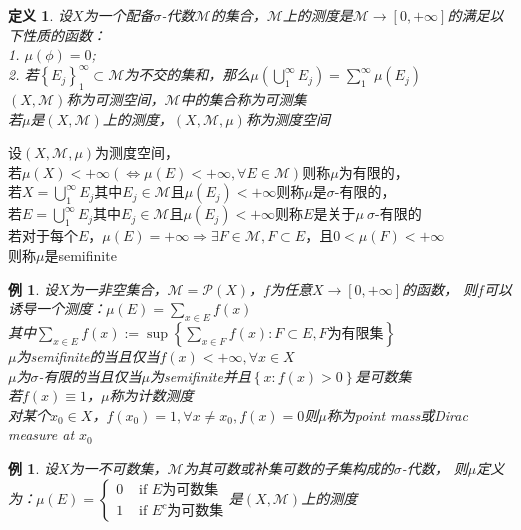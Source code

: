 \documentclass[12pt, a4paper, oneside]{ctexbook}
\newtheorem{definition}[theorem]{定义}
\newtheorem{example}[theorem]{例}
\begin{document}
\begin{definition}
    设$X$为一个配备$\sigma$-代数$\mathcal{M}$的集合，$\mathcal{M}$上的测度是$\mathcal{M}\rightarrow[0,+\infty]$的满足以下性质的函数：\\
    1. $\mu(\phi)=0$;\\
    2. 若$\left\{E_j\right\}_1^{\infty}\subset\mathcal{M}$为不交的集和，那么$\mu(\bigcup_1^{\infty}E_j)=\sum_{1}^{\infty}\mu(E_j)$\\
    $(X,\mathcal{M})$称为可测空间，$\mathcal{M}$中的集合称为可测集\\
    若$\mu$是$(X,\mathcal{M})$上的测度，$(X,\mathcal{M},\mu)$称为测度空间
\end{definition}
    设$(X,\mathcal{M},\mu)$为测度空间，\\
    若$\mu(X)<+\infty(\Leftrightarrow\mu(E)<+\infty,\forall E\in\mathcal{M})$则称$\mu$为有限的，\\
    若$X=\bigcup_1^{\infty}E_j$其中$E_j\in\mathcal{M}$且$\mu(E_j)<+\infty$则称$\mu$是$\sigma$-有限的，\\
    若$E=\bigcup_1^{\infty}E_j$其中$E_j\in\mathcal{M}$且$\mu(E_j)<+\infty$则称$E$是关于$\mu\ \sigma$-有限的\\
    若对于每个$E$，$\mu(E)=+\infty\Rightarrow\exists F\in\mathcal{M},F\subset E$，且$0<\mu(F)<+\infty$\\
    则称$\mu$是semifinite
\begin{example}
    设$X$为一非空集合，$\mathcal{M}=\mathcal{P}(X)$，$f$为任意$X\rightarrow[0,+\infty]$的函数，
    则$f$可以诱导一个测度：$\mu(E)=\sum_{x\in E}f(x)$\\
    其中$\sum_{x\in E}f(x):=\sup\left\{\sum_{x\in F}f(x):F\subset E,F\text{为有限集}\right\}$\\
    $\mu$为semifinite的当且仅当$f(x)<+\infty,\forall x\in X$\\
    $\mu$为$\sigma$-有限的当且仅当$\mu$为semifinite并且$\left\{x:f(x)>0\right\}$是可数集\\
    若$f(x)\equiv 1$，$\mu$称为计数测度\\
    对某个$x_0\in X$，$f(x_0)=1,\forall x\neq x_0,f(x)=0$则$\mu$称为point mass或Dirac measure at $x_0$
\end{example}
\begin{example}
    设$X$为一不可数集，$\mathcal{M}$为其可数或补集可数的子集构成的$\sigma$-代数，
    则$\mu$定义为：$\mu(E)=\begin{cases}
        0& \text{ if } E\text{为可数集} \\
        1& \text{ if } E^c\text{为可数集}
      \end{cases}$是$(X,\mathcal{M})$上的测度
\end{example}
\end{document}
